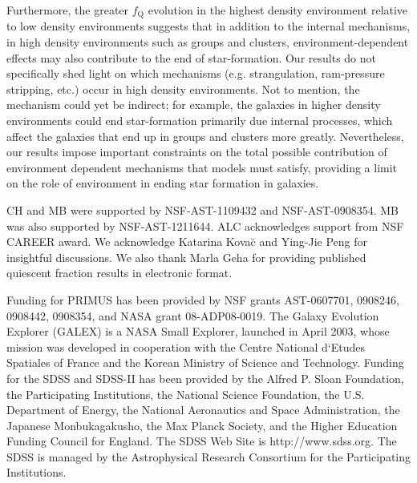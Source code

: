 \documentclass{emulateapj}
\begin{document}
Furthermore, the greater $f_{\mathrm{Q}}$ evolution in the highest density
environment relative to low density environments suggests that in
addition to the internal mechanisms, in high density environments such
as groups and clusters, environment-dependent effects may also
contribute to the end of star-formation. Our results do not
specifically shed light on which mechanisms (e.g. strangulation,
ram-pressure stripping, etc.) occur in high density environments. Not to 
mention, the mechanism could yet be indirect; for example, the
galaxies in higher density environments could end star-formation
primarily due internal processes, which affect the galaxies that end up
in groups and clusters more greatly.  Nevertheless, our results impose
important constraints on the total possible contribution of
environment dependent mechanisms that models must satisfy, providing a
limit on the role of environment in ending star formation in
galaxies. 

\bigskip 
CH and MB were supported by NSF-AST-1109432 and NSF-AST-0908354. MB was also supported by NSF-AST-1211644. ALC acknowledges support from NSF CAREER award. We acknowledge Katarina Kova\u{c} and Ying-Jie Peng for  insightful discussions. We also thank Marla Geha for providing published quiescent fraction results in electronic format.

Funding for PRIMUS has been provided by NSF grants AST-0607701, 0908246, 0908442, 0908354, and NASA grant 08-ADP08-0019. The Galaxy Evolution Explorer (GALEX) is a NASA Small Explorer, launched in April 2003, whose mission was developed in cooperation with the Centre National d`Etudes Spatiales of France and the Korean Ministry of Science and Technology. Funding for the SDSS and SDSS-II has been provided by the Alfred P. Sloan Foundation, the Participating Institutions, the National Science Foundation, the U.S. Department of Energy, the National Aeronautics and Space Administration, the Japanese Monbukagakusho, the Max Planck Society, and the Higher Education Funding Council for England. The SDSS Web Site is http://www.sdss.org. The SDSS is managed by the Astrophysical Research Consortium for the Participating Institutions. 
\end{document}
